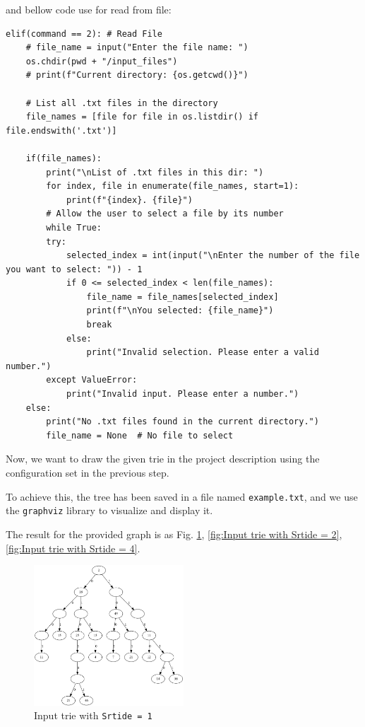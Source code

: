 \documentclass[12pt	]{article}
\begin{document}
and bellow code use for read from file:
\begin{lstlisting}[style=pythonstyle, caption={Read From File Command}]
elif(command == 2): # Read File
	# file_name = input("Enter the file name: ")
	os.chdir(pwd + "/input_files")
	# print(f"Current directory: {os.getcwd()}")
	
	# List all .txt files in the directory
	file_names = [file for file in os.listdir() if file.endswith('.txt')]
	
	if(file_names):
		print("\nList of .txt files in this dir: ")
		for index, file in enumerate(file_names, start=1):
			print(f"{index}. {file}")
		# Allow the user to select a file by its number
		while True:
		try:
			selected_index = int(input("\nEnter the number of the file you want to select: ")) - 1
			if 0 <= selected_index < len(file_names):
				file_name = file_names[selected_index]
				print(f"\nYou selected: {file_name}")
				break
			else:
				print("Invalid selection. Please enter a valid number.")
		except ValueError:
			print("Invalid input. Please enter a number.")
	else:
		print("No .txt files found in the current directory.")
		file_name = None  # No file to select
\end{lstlisting}




Now, we want to draw the given trie in the project description using the configuration set in the previous step.

To achieve this, the tree has been saved in a file named \texttt{example.txt}, and we use the \texttt{graphviz} library to visualize and display it.

The result for the provided graph is as Fig. \ref{fig:Input trie with Srtide = 1}, \ref{fig:Input trie with Srtide = 2}, \ref{fig:Input trie with Srtide = 4}.
\begin{figure}[h!]
	\centering
	\includegraphics[width=0.5\textwidth]{Images/img6.png}
	\caption{Input trie with \texttt{Srtide = 1}}
	\label{fig:Input trie with Srtide = 1}
\end{figure}
\end{document}
